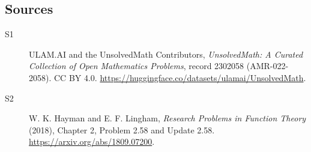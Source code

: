 \documentclass[11pt]{article}
\begin{document}
\subsection{Sources}
\begin{description}
\item[\hypertarget{source:2302058:1}{S1}] ULAM.AI and the UnsolvedMath Contributors, \emph{UnsolvedMath: A Curated Collection of Open Mathematics Problems}, record 2302058 (AMR-022-2058). CC BY 4.0. \url{https://huggingface.co/datasets/ulamai/UnsolvedMath}.
\item[\hypertarget{source:2302058:2}{S2}] W. K. Hayman and E. F. Lingham, \emph{Research Problems in Function Theory} (2018), Chapter 2, Problem 2.58 and Update 2.58. \url{https://arxiv.org/abs/1809.07200}.
\end{description}
\label{end:2302058}
\end{document}
